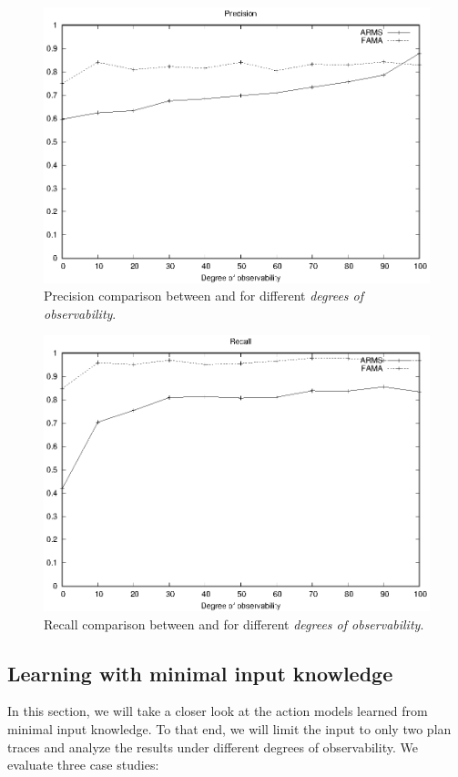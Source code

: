 \begin{figure}[hbt!]
	\centering
	\includegraphics[width=.65\linewidth]{figures/comparison_precision.eps}
	\caption{Precision comparison between \FAMA and \ARMS for different \emph{degrees of observability}.}
	\label{fig:comparison_precision}
\end{figure}

\begin{figure}[hbt!]
	\centering
	\includegraphics[width=.65\linewidth]{figures/comparison_recall.eps}
	\caption{Recall comparison between \FAMA and \ARMS for different \emph{degrees of observability}.}
	\label{fig:comparison_recall}
\end{figure}



\subsection{Learning with minimal input knowledge}
\label{minimal}


In this section, we will take a closer look at the action models learned from minimal input knowledge. To that end, we will limit the input to only two plan traces and analyze the results under different degrees of observability. We evaluate three case studies:

